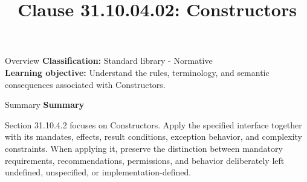 \documentclass[10pt,letterpaper]{article}
\title{Clause 31.10.04.02: Constructors}
\author{}
\date{}
\begin{document}
\maketitle
\begin{CornellOverviewBox}{Overview}
\textbf{Classification:} Standard library - Normative\\[2pt]
\textbf{Learning objective:} Understand the rules, terminology, and semantic consequences associated with Constructors.
\end{CornellOverviewBox}\begin{CornellSummaryBox}{Summary}
{\sffamily\bfseries\color{Accent} Summary}\par\vspace{3pt}Section 31.10.4.2 focuses on Constructors. Apply the specified interface together with its mandates, effects, result conditions, exception behavior, and complexity constraints. When applying it, preserve the distinction between mandatory requirements, recommendations, permissions, and behavior deliberately left undefined, unspecified, or implementation-defined.
\end{CornellSummaryBox}
\end{document}
